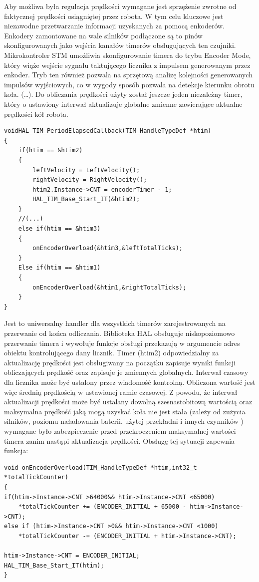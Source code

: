 \documentclass[eng,printmode]{mgr}
\begin{document}
Aby możliwa była regulacja prędkości wymagane jest sprzężenie zwrotne od faktycznej prędkości osiągniętej przez robota. W tym celu kluczowe jest niezawodne przetwarzanie informacji uzyskanych za pomocą enkoderów. Enkodery zamontowane na wale silników podłączone są to pinów skonfigurowanych jako wejścia kanałów timerów obsługujących ten czujniki. Mikrokontroler STM umożliwia skonfigurowanie timera do trybu Encoder Mode, który wiąże wejście sygnału taktującego licznika z impulsem generowanym przez enkoder. Tryb ten również pozwala na sprzętową analizę kolejności generowanych impulsów wyjściowych, co w wygody sposób pozwala na detekcje kierunku obrotu koła.  (…). Do obliczania prędkości użyty został jeszcze jeden niezależny timer, który o ustawiony interwał aktualizuje globalne zmienne zawierające aktualne prędkości kół robota. 
\begin{lstlisting}[style=c]
voidHAL_TIM_PeriodElapsedCallback(TIM_HandleTypeDef *htim)
{
	if(htim == &htim2)
	{
		leftVelocity = LeftVelocity();
		rightVelocity = RightVelocity();
		htim2.Instance->CNT = encoderTimer - 1;
		HAL_TIM_Base_Start_IT(&htim2);
	}
	//(...)
	else if(htim == &htim3)
	{
		onEncoderOverload(&htim3,&leftTotalTicks);
	}
	Else if(htim == &htim1)
	{
		onEncoderOverload(&htim1,&rightTotalTicks);
	}	
}

\end{lstlisting}
Jest to uniwersalny handler dla wszystkich timerów zarejestrowanych na przerwanie od końca odliczania. Biblioteka HAL obsługuje niskopoziomowo przerwanie timera i wywołuje funkcje obsługi przekazują w argumencie adres obiektu kontrolującego dany licznik. Timer (htim2) odpowiedzialny  za aktualizację prędkości jest obsługiwany na początku zapisuje wyniki funkcji obliczających prędkość oraz zapisuje je zmiennych globalnych. Interwał czasowy dla licznika może być ustalony przez wiadomość kontrolną. Obliczona wartość  jest więc średnią prędkością w ustawionej ramie czasowej.  Z powodu, że interwał aktualizacji prędkości może być ustalany dowolną  szesnastobitową wartością oraz maksymalna prędkość jaką mogą uzyskać koła nie jest stała (zależy od zużycia silników, poziomu naładowania baterii, użytej przekładni i innych czynników ) wymagane było zabezpieczenie przed przekroczeniem maksymalnej wartości timera zanim nastąpi aktualizacja prędkości. Obsługę tej sytuacji zapewnia funkcja:
\begin{lstlisting}[style=c]
void onEncoderOverload(TIM_HandleTypeDef *htim,int32_t *totalTickCounter)
{
if(htim->Instance->CNT >64000&& htim->Instance->CNT <65000)
	*totalTickCounter += (ENCODER_INITIAL + 65000 - htim->Instance->CNT);
else if (htim->Instance->CNT >0&& htim->Instance->CNT <1000)
	*totalTickCounter -= (ENCODER_INITIAL + htim->Instance->CNT);

htim->Instance->CNT = ENCODER_INITIAL;
HAL_TIM_Base_Start_IT(htim);
}

\end{lstlisting}
\end{document}
